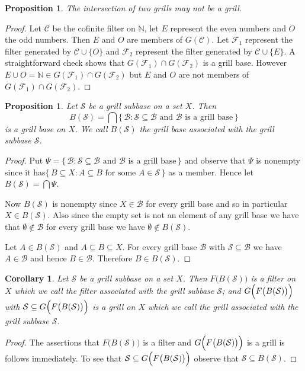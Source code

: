 \documentclass[12pt]{article}
\theoremstyle{plain}
\newtheorem{prop}[thm]{Proposition}
\newtheorem{cor}[thm]{Corollary}
\theoremstyle{definition}
\newcommand{\bbN}{\mathbb{N}}
\newcommand{\calB}{\mathcal{B}}
\newcommand{\calC}{\mathcal{C}}
\newcommand{\calF}{\mathcal{F}}
\newcommand{\calS}{\mathcal{S}}
\begin{document}
\begin{prop}
  The intersection of two grills may not be a grill.
\end{prop}
\begin{proof}
  Let $\calC$ be the cofinite filter on $\bbN$, let $E$ represent the even numbers and $O$ the odd numbers.
  Then $E$ and $O$ are members of $G(\calC)$.
  Let $\calF_1$ represent the filter generated by $\calC \cup \{O\}$ and $\calF_2$ represent the filter generated by $\calC \cup \{E\}$.
  A straightforward check shows that $G(\calF_1) \cap G(\calF_2)$ is a grill base. 
  However $E \cup O = \bbN \in G(\calF_1) \cap G(\calF_2)$ but $E$ and $O$ are not members of $G(\calF_1) \cap G(\calF_2)$.
\end{proof}


\begin{prop}
  Let $\calS$ be a grill subbase on a set $X$.
  Then
  \[
    B(\calS) = \bigcap\{\, \calB : \mbox{$\calS \subseteq \calB$ and $\calB$ is a grill base} \,\}
  \]
  is a grill base on $X$.
  We call $B(\calS)$ the \textsl{grill base associated with the grill subbase $\calS$}.
\end{prop}
\begin{proof}
  Put $\Psi = \{\, \calB : \mbox{$\calS \subseteq \calB$ and $\calB$ is a grill base} \,\}$ and observe that $\Psi$ is nonempty since it has$\{\, B \subseteq X : \mbox{$A \subseteq B$ for some $A \in \calS$} \,\}$ as a member.
  Hence let $B(\calS) = \bigcap\Psi$.

  Now $B(\calS)$ is nonempty since $X \in \calB$ for every grill base and so in particular $X \in B(\calS)$.
  Also since the empty set is not an element of any grill base we have that $\emptyset \not\in \calB$ for every grill base we have $\emptyset \not\in B(\calS)$.

  Let $A \in B(\calS)$ and $A \subseteq B \subseteq X$. 
  For every grill base $\calB$ with $\calS \subseteq \calB$ we have $A \in \calB$ and hence $B \in \calB$.
  Therefore $B \in B(\calS)$.
\end{proof}

\begin{cor}
  Let $\calS$ be a grill subbase on a set $X$.
  Then $F\bigl(B(\calS)\bigr)$ is a filter on $X$ which we call the \textsl{filter associated with the grill subbase $\calS$}; and $G\Bigl(F\bigl(B(\calS)\bigr)\Bigr)$ with $\calS \subseteq G\Bigl(F\bigl(B(\calS)\bigr)\Bigr)$ is a grill on $X$ which we call the \textsl{grill associated with the grill subbase $\calS$}. 
\end{cor}
\begin{proof}
  The assertions that $F\bigl(B(\calS)\bigr)$ is a filter and $G\Bigl(F\bigl(B(\calS)\bigr)\Bigr)$ is a grill is follows immediately.
  To see that $\calS \subseteq G\Bigl(F\bigl(B(\calS)\bigr)\Bigr)$ observe that $\calS \subseteq B(\calS)$.
\end{proof}
\end{document}
